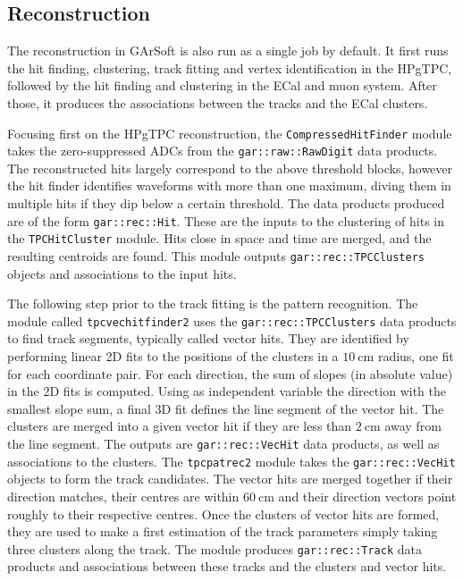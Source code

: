 \subsection{Reconstruction}

The reconstruction in GArSoft is also run as a single job by default. It first runs the hit finding, clustering, track fitting and vertex identification in the HPgTPC, followed by the hit finding and clustering in the ECal and muon system. After those, it produces the associations between the tracks and the ECal clusters.

Focusing first on the HPgTPC reconstruction, the \texttt{CompressedHitFinder} module takes the zero-suppressed ADCs from the \texttt{gar::raw::RawDigit} data products. The reconstructed hits largely correspond to the above threshold blocks, however the hit finder identifies waveforms with more than one maximum, diving them in multiple hits if they dip below a certain threshold. The data products produced are of the form \texttt{gar::rec::Hit}. These are the inputs to the clustering of hits in the \texttt{TPCHitCluster} module. Hits close in space and time are merged, and the resulting centroids are found. This module outputs \texttt{gar::rec::TPCClusters} objects and associations to the input hits.

The following step prior to the track fitting is the pattern recognition. The module called \texttt{tpcvechitfinder2} uses the \texttt{gar::rec::TPCClusters} data products to find track segments, typically called vector hits. They are identified by performing linear 2D fits to the positions of the clusters in a $10~\mathrm{cm}$ radius, one fit for each coordinate pair. For each direction, the sum of slopes (in absolute value) in the 2D fits is computed. Using as independent variable the direction with the smallest slope sum, a final 3D fit defines the line segment of the vector hit. The clusters are merged into a given vector hit if they are less than $2~\mathrm{cm}$ away from the line segment. The outputs are \texttt{gar::rec::VecHit} data products, as well as associations to the clusters. The \texttt{tpcpatrec2} module takes the \texttt{gar::rec::VecHit} objects to form the track candidates. The vector hits are merged together if their direction matches, their centres are within $60~\mathrm{cm}$ and their direction vectors point roughly to their respective centres. Once the clusters of vector hits are formed, they are used to make a first estimation of the track parameters simply taking three clusters along the track. The module produces \texttt{gar::rec::Track} data products and associations between these tracks and the clusters and vector hits.

